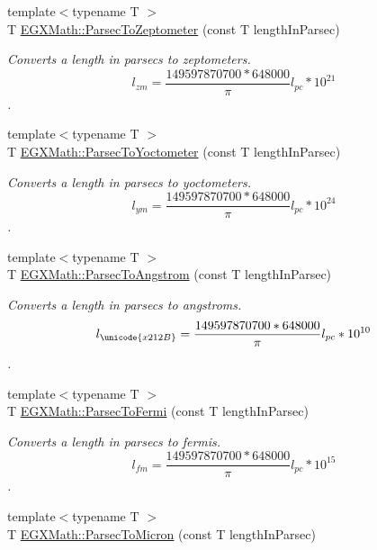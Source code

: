 \begin{DoxyCompactItemize}
{\footnotesize template$<$typename T $>$ }\\T \mbox{\hyperlink{group___e_g_x_math-_conversions-_length_conversions-_astronomical-_parsec-_s_i_ga3334cc4dbcddb1ae43e821f518bb56cb}{E\+G\+X\+Math\+::\+Parsec\+To\+Zeptometer}} (const T length\+In\+Parsec)
\begin{DoxyCompactList}\small\item\em Converts a length in parsecs to zeptometers. \[ l_{zm}=\frac{149597870700 * 648000}{\pi}l_{pc} * 10^{21} \]. \end{DoxyCompactList}\item 
{\footnotesize template$<$typename T $>$ }\\T \mbox{\hyperlink{group___e_g_x_math-_conversions-_length_conversions-_astronomical-_parsec-_s_i_ga2c745c68a73ead9c11af6bc86ce3e3f6}{E\+G\+X\+Math\+::\+Parsec\+To\+Yoctometer}} (const T length\+In\+Parsec)
\begin{DoxyCompactList}\small\item\em Converts a length in parsecs to yoctometers. \[ l_{ym}=\frac{149597870700 * 648000}{\pi}l_{pc} * 10^{24} \]. \end{DoxyCompactList}\item 
{\footnotesize template$<$typename T $>$ }\\T \mbox{\hyperlink{group___e_g_x_math-_conversions-_length_conversions-_astronomical-_parsec-_non-_s_i_gae9721658cb4d8b9e1cfd85f20d646702}{E\+G\+X\+Math\+::\+Parsec\+To\+Angstrom}} (const T length\+In\+Parsec)
\begin{DoxyCompactList}\small\item\em Converts a length in parsecs to angstroms. \[ l_{\unicode{x212B}}=\frac{149597870700 * 648000}{\pi}l_{pc} * 10^{10} \]. \end{DoxyCompactList}\item 
{\footnotesize template$<$typename T $>$ }\\T \mbox{\hyperlink{group___e_g_x_math-_conversions-_length_conversions-_astronomical-_parsec-_non-_s_i_gac157e45cbd0a0ef15a52dcc59a7b40ad}{E\+G\+X\+Math\+::\+Parsec\+To\+Fermi}} (const T length\+In\+Parsec)
\begin{DoxyCompactList}\small\item\em Converts a length in parsecs to fermis. \[ l_{fm}=\frac{149597870700 * 648000}{\pi}l_{pc} * 10^{15} \]. \end{DoxyCompactList}\item 
{\footnotesize template$<$typename T $>$ }\\T \mbox{\hyperlink{group___e_g_x_math-_conversions-_length_conversions-_astronomical-_parsec-_non-_s_i_ga9460305baf1a39635da24198d888a91b}{E\+G\+X\+Math\+::\+Parsec\+To\+Micron}} (const T length\+In\+Parsec)

\end{DoxyCompactItemize}
